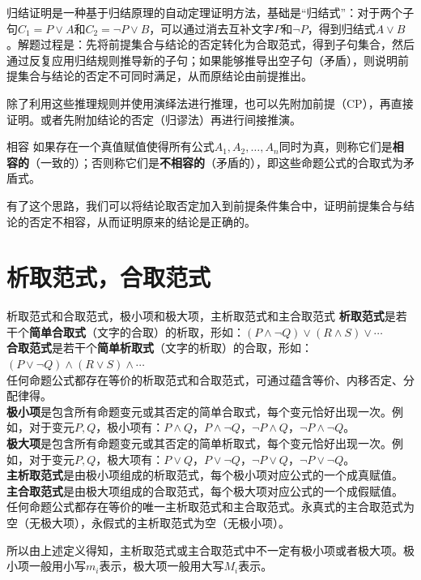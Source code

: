 \documentclass[lang=cn,11pt]{elegantbook}
\begin{document}
归结证明是一种基于归结原理的自动定理证明方法，基础是“归结式”：对于两个子句$C_1 = P \lor A$和$C_2 = \neg P \lor B$，可以通过消去互补文字$P$和$\neg P$，得到归结式$A \lor B$。解题过程是：先将前提集合与结论的否定转化为合取范式，得到子句集合，然后通过反复应用归结规则推导新的子句；如果能够推导出空子句（矛盾），则说明前提集合与结论的否定不可同时满足，从而原结论由前提推出。

除了利用这些推理规则并使用演绎法进行推理，也可以先附加前提（CP），再直接证明。或者先附加结论的否定（归谬法）再进行间接推演。
\begin{definition}{相容}
    如果存在一个真值赋值使得所有公式$A_1, A_2, \ldots, A_n$同时为真，则称它们是\textbf{相容的}（一致的）；否则称它们是\textbf{不相容的}（矛盾的），即这些命题公式的合取式为矛盾式。
\end{definition}
有了这个思路，我们可以将结论取否定加入到前提条件集合中，证明前提集合与结论的否定不相容，从而证明原来的结论是正确的。
\section{析取范式，合取范式}
\begin{definition}{析取范式和合取范式，极小项和极大项，主析取范式和主合取范式}
\textbf{析取范式}是若干个\textbf{简单合取式}（文字的合取）的析取，形如：$(P \land \neg Q) \lor (R \land S) \lor \cdots$\\
\textbf{合取范式}是若干个\textbf{简单析取式}（文字的析取）的合取，形如：$(P \lor \neg Q) \land (R \lor S) \land \cdots$\\
任何命题公式都存在等价的析取范式和合取范式，可通过蕴含等价、内移否定、分配律得。\\
\textbf{极小项}是包含所有命题变元或其否定的简单合取式，每个变元恰好出现一次。例如，对于变元$P,Q$，极小项有：$P \land Q$，$P \land \neg Q$，$\neg P \land Q$，$\neg P \land \neg Q$。\\
\textbf{极大项}是包含所有命题变元或其否定的简单析取式，每个变元恰好出现一次。例如，对于变元$P,Q$，极大项有：$P \lor Q$，$P \lor \neg Q$，$\neg P \lor Q$，$\neg P \lor \neg Q$。\\
\textbf{主析取范式}是由极小项组成的析取范式，每个极小项对应公式的一个成真赋值。\\
\textbf{主合取范式}是由极大项组成的合取范式，每个极大项对应公式的一个成假赋值。\\
任何命题公式都存在等价的唯一主析取范式和主合取范式。永真式的主合取范式为空（无极大项），永假式的主析取范式为空（无极小项）。
\end{definition}
所以由上述定义得知，主析取范式或主合取范式中不一定有极小项或者极大项。极小项一般用小写$m_i$表示，极大项一般用大写$M_i$表示。
\end{document}
